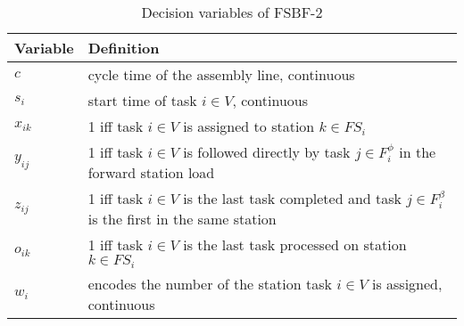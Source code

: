 \begin{table}[tbp]
	\def\arraystretch{1.1}
	\centering
	\caption{Decision variables of FSBF-2}
	\vspace{2mm}
	\begin{tabular}{lp{}}
		\toprule
		Variable & Definition \\\midrule\midrule
		$c$ & cycle time of the assembly line, continuous\\
		$s_i$ & start time of task $i\in V$, continuous \\
		$x_{ik}$ & 1 iff task $i \in V$ is assigned to station $k \in FS_i$ \\
		$y_{ij}$ & 1 iff task $i \in V$ is followed directly by task $j \in F_i^\phi$ in the forward station load \\
		$z_{ij}$ & 1 iff task $i \in V$ is the last task completed and task $j \in F_i^\beta$ is the first in the same station \\
		$o_{ik}$ & 1 iff task $i \in V$ is the last task processed on station $k \in FS_i$ \\
		$w_i$ & encodes the number of the station task $i\in V$ is assigned, continuous \\
		\bottomrule
	\end{tabular}
	\label{tab:mip:fsbfVars}
\end{table}

